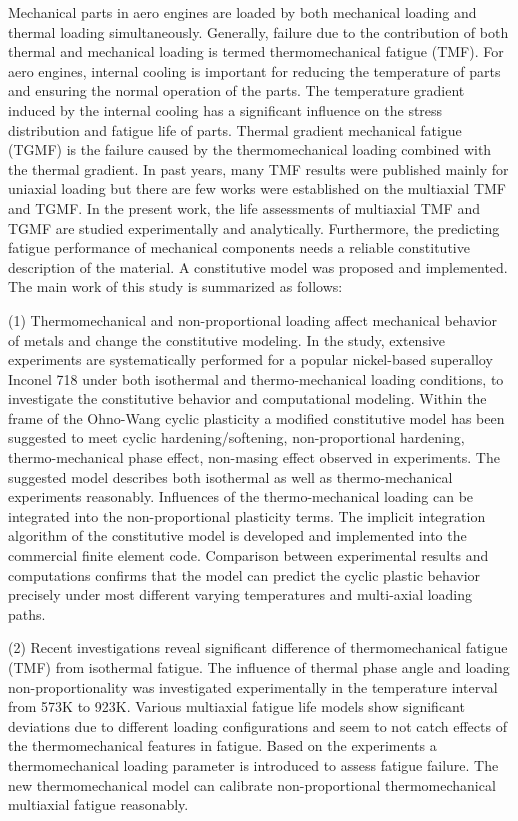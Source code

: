 \noindent
Mechanical parts in aero engines are loaded by both mechanical loading and thermal loading simultaneously. Generally, failure due to the contribution of both thermal and mechanical loading is termed thermomechanical fatigue (TMF). For aero engines, internal cooling is important for reducing the temperature of parts and ensuring the normal operation of the parts. The temperature gradient induced by the internal cooling has a significant influence on the stress distribution and fatigue life of parts. Thermal gradient mechanical fatigue (TGMF) is the failure caused by the thermomechanical loading combined with the thermal gradient. In past years, many TMF results were published mainly for uniaxial loading but there are few works were established on the multiaxial TMF and TGMF. In the present work, the life assessments of multiaxial TMF and TGMF are studied experimentally and analytically. Furthermore, the predicting fatigue performance of mechanical components needs a reliable constitutive description of the material. A constitutive model was proposed and implemented. The main work of this study is summarized as follows:

(1) Thermomechanical and non-proportional loading affect mechanical behavior of metals and change the constitutive modeling. In the study, extensive experiments are systematically performed for a popular nickel-based superalloy Inconel 718 under both isothermal and thermo-mechanical loading conditions, to investigate the constitutive behavior and computational modeling. Within the frame of the Ohno-Wang cyclic plasticity a modified constitutive model has been suggested to meet  cyclic hardening/softening, non-proportional hardening, thermo-mechanical phase effect, non-masing effect observed in experiments. The suggested model describes both isothermal as well as thermo-mechanical experiments reasonably. Influences of the thermo-mechanical loading can be integrated into the non-proportional plasticity terms. The implicit integration algorithm of the constitutive model is developed and implemented into the commercial finite element code. Comparison between  experimental results and computations confirms that the model can predict the cyclic plastic behavior precisely under most different varying temperatures and multi-axial loading paths.

(2) Recent investigations reveal significant difference of thermomechanical fatigue (TMF) from isothermal fatigue. The influence of thermal phase angle and loading non-proportionality was investigated experimentally in the temperature interval from 573K to 923K. Various multiaxial fatigue life models show significant deviations due to different loading configurations and seem to not catch effects of the thermomechanical features in fatigue. Based on the experiments a thermomechanical loading parameter is introduced to assess fatigue failure. The new thermomechanical model can calibrate non-proportional thermomechanical multiaxial fatigue reasonably.


